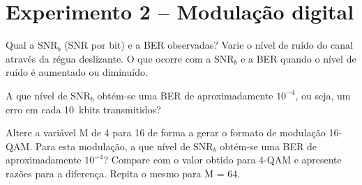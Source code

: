 \documentclass[12pt,addpoints]{exam}
\begin{document}
%
%
%

\section*{Experimento 2 -- Modulação digital}

\begin{questions}
    \question Qual a SNR$_b$ (SNR por bit) e a BER observadas? Varie o nível de ruído do canal através da régua deslizante. O que ocorre com a SNR$_b$ e a BER quando o nível de ruído é aumentado ou diminuído.
    \fillwithlines{0.75in}
    
    \question A que nível de SNR$_b$ obtém-se uma BER de aproximadamente $10^{-4}$, ou seja, um erro em cada 10~kbits transmitidos?
    \fillwithlines{0.25in}
    
    \question Altere a variável M de 4 para 16 de forma a gerar o formato de modulação 16-QAM. Para esta modulação, a que nível de SNR$_b$ obtém-se uma BER de aproximadamente $10^{-4}$? Compare com o valor obtido para 4-QAM e apresente razões para a diferença. Repita o mesmo para M = 64.
    
    \fillwithlines{1in}
\end{questions}
\end{document}

